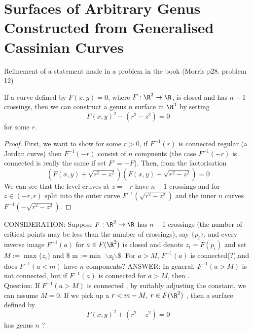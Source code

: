 \documentclass{article}
\begin{document}
\section{Surfaces of Arbitrary Genus Constructed from Generalised Cassinian Curves}
\label{sec:org59fca84}
Refinement of a statement made in a problem in the book (Morris \cite{Hirsch} p28. problem 12)
\begin{thm}
 If a curve defined by $F(x,y) = 0$, where $F:\R^2 \rightarrow \R$, is closed and has $n-1$ crossings, then we can construct a genus $n$ surface in $\R^3$ by setting
\begin{equation}
\label{ }
F(x,y)^2 - ( r^2 - z^2) = 0 
\end{equation}
for some $r$.
\end{thm}
\begin{proof}
 First, we want to show for some $r > 0$, if $F^{-1}(r)$ is connected regular (a Jordan curve) then $F^{-1}(-r)$ consist of $n$ compnents (the case $F^{-1}(-r)$ is connected is really the same if set $F' = -F$). Then, from the factorisation
\begin{equation}
\label{ }
(F(x,y) + \sqrt{r^2-z^2})(F(x,y) - \sqrt{r^2-z^2}) = 0
\end{equation}
 We can see that the level cruves at $z=\pm r$ have $n-1$ crossings and for $z \in (-r,r)$ split into the outer curve $F^{-1}(\sqrt{r^2-z^2})$ and the inner $n$ curves $F^{-1}(-\sqrt{r^2-z^2})$.
\end{proof}
CONSIDERATION: Suppose \(F:\R^2 \rightarrow \R\) has \(n-1\) crossings (the number of critical points may be less than the number of crossings), say \(\{p_{i}\}\), and every inverse image \(F^{-1}(a)\) for \(a\in F(\R^2)\) is closed and denote \(z_i=F(p_i)\) and set \(M:= \max\{z_i\}\) and \$ m :=\(\min\) $\backslash${z\textsubscript{i}$\backslash$}\$. For \(a>M\), \(F^{-1}(a)\) is connected(?),and does \(F^{-1}(a<m)\) have \(n\) components? ANSWER: In general, \(F^{-1}(a>M)\) is not connected, but if \(F^{-1}(a)\) is connected for \(a>M\), then .\\
Question: If \(F^{-1}(a>M)\) is connected , by suitably adjusting the constant, we can assume \(M=0\). If we pick up a \(r< m-M, \; r \in F(\R^2)\) , then a surface defined by
\begin{equation}
\label{ }
F(x,y)^2 + (r^2 - z^2) = 0
\end{equation}
has genus \(n\) ?
\end{document}
